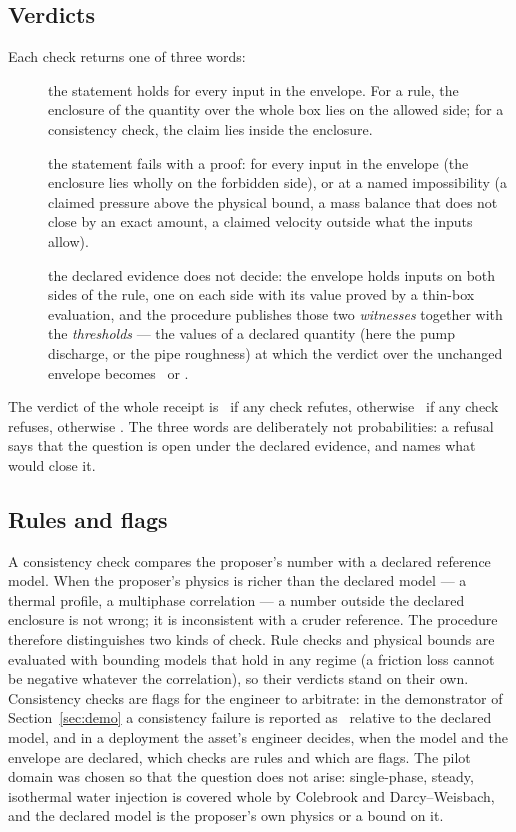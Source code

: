 \documentclass[preprint,11pt,authoryear]{elsarticle}
\begin{document}
\subsection{Verdicts}
Each check returns one of three words:
\begin{description}
\item[\vProved] the statement holds for every input in the envelope. For a rule, the enclosure of the quantity over the whole box lies on the allowed side; for a consistency check, the claim lies inside the enclosure.
\item[\vRefuted] the statement fails with a proof: for every input in the envelope (the enclosure lies wholly on the forbidden side), or at a named impossibility (a claimed pressure above the physical bound, a mass balance that does not close by an exact amount, a claimed velocity outside what the inputs allow).
\item[\vRefused] the declared evidence does not decide: the envelope holds inputs on both sides of the rule, one on each side with its value proved by a thin-box evaluation, and the procedure publishes those two \emph{witnesses} together with the \emph{thresholds} --- the values of a declared quantity (here the pump discharge, or the pipe roughness) at which the verdict over the unchanged envelope becomes \vProved\ or \vRefuted.
\end{description}
The verdict of the whole receipt is \vRefuted\ if any check refutes, otherwise \vRefused\ if any check refuses, otherwise \vProved. The three words are deliberately not probabilities: a refusal says that the question is open under the declared evidence, and names what would close it.

\subsection{Rules and flags}
A consistency check compares the proposer's number with a declared reference model. When the proposer's physics is richer than the declared model --- a thermal profile, a multiphase correlation --- a number outside the declared enclosure is not wrong; it is inconsistent with a cruder reference. The procedure therefore distinguishes two kinds of check. Rule checks and physical bounds are evaluated with bounding models that hold in any regime (a friction loss cannot be negative whatever the correlation), so their verdicts stand on their own. Consistency checks are flags for the engineer to arbitrate: in the demonstrator of Section~\ref{sec:demo} a consistency failure is reported as \vRefuted\ relative to the declared model, and in a deployment the asset's engineer decides, when the model and the envelope are declared, which checks are rules and which are flags. The pilot domain was chosen so that the question does not arise: single-phase, steady, isothermal water injection is covered whole by Colebrook and Darcy--Weisbach, and the declared model is the proposer's own physics or a bound on it.
\end{document}
